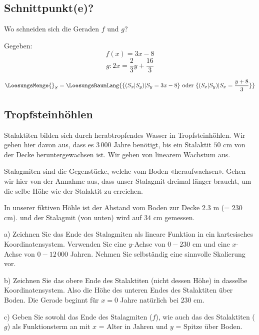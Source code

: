 \subsection{Schnittpunkt(e)?}
Wo schneiden sich die Geraden $f$ und $g$?

Gegeben:
$$f(x) = 3x - 8$$
$$g: 2x=\frac23y+\frac{16}3$$

\vspace{5mm}
$$\LoesungsMenge{}_S=\LoesungsRaumLang{\{ (S_x|S_y) | S_y = 3x-8  \} \text{ oder } \{ (S_x|S_y) | S_x = \frac{y+8}3  \}}$$
\subsection{Tropfsteinhöhlen}

Stalaktiten bilden sich durch herabtropfendes Wasser in Tropfsteinhöhlen.
Wir gehen hier davon aus, dass es $3\,000$ Jahre benötigt, bis ein
Stalaktit $50$ cm von der Decke heruntergewachsen ist. Wir gehen von
linearem Wachstum aus.

Stalagmiten sind die Gegenstücke, welche vom Boden
«heraufwachsen». Gehen wir hier von der Annahme aus, dass unser
Stalagmit dreimal länger braucht, um die selbe Höhe wie der Stalaktit zu erreichen.

In unserer fiktiven Höhle ist der Abstand vom Boden zur Decke $2.3$ m
(= $230$ cm). und der Stalagmit (von unten) wird auf $34$ cm gemessen.

a) Zeichnen Sie das Ende des Stalagmiten als
lineare Funktion in ein kartesisches Koordinatensystem. Verwenden Sie
eine $y$-Achse von $0 - 230$ cm und eine $x$-Achse von $0-12\,000$
Jahren. Nehmen Sie selbständig eine sinnvolle Skalierung vor.


b) Zeichnen Sie das obere Ende des Stalaktiten (nicht dessen Höhe) in
dasselbe Koordinatensystem. Also die Höhe des unteren Endes des
Stalaktiten über Boden. Die Gerade beginnt für $x=0$ Jahre
natürlich bei $230$ cm.
\newpage

c) Geben Sie sowohl das Ende des Stalagmiten ($f$), wie auch das des
Stalaktiten ($g$) als Funktionsterm an mit $x$ = Alter in Jahren und
$y$ = Spitze über Boden.




